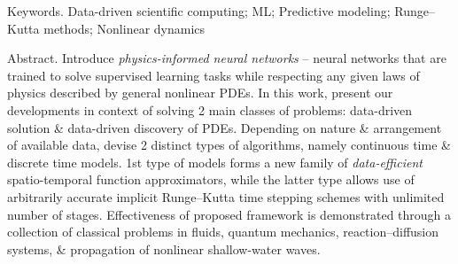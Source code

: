 \documentclass{article}
\begin{document}
{\sf Keywords.} Data-driven scientific computing; ML; Predictive modeling; Runge--Kutta methods; Nonlinear dynamics

{\sf Abstract.} Introduce {\it physics-informed neural networks} -- neural networks that are trained to solve supervised learning tasks while respecting any given laws of physics described by general nonlinear PDEs. In this work, present our developments in context of solving 2 main classes of problems: data-driven solution \& data-driven discovery of PDEs. Depending on nature \& arrangement of available data, devise 2 distinct types of algorithms, namely continuous time \& discrete time models. 1st type of models forms a new family of {\it data-efficient} spatio-temporal function approximators, while the latter type allows use of arbitrarily accurate implicit Runge--Kutta time stepping schemes with unlimited number of stages. Effectiveness of proposed framework is demonstrated through a collection of classical problems in fluids, quantum mechanics, reaction--diffusion systems, \& propagation of nonlinear shallow-water waves.
\end{document}
